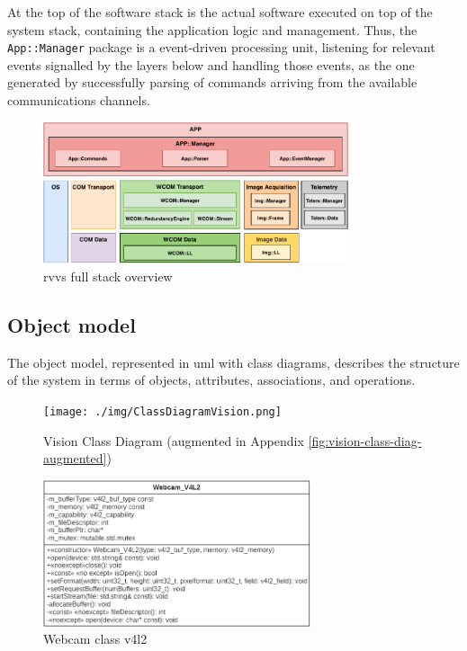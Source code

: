At the top of the software stack is the actual software executed on top of the
system stack, containing the application logic and management. Thus, the
\texttt{App::Manager} package is a event-driven processing unit, listening for
relevant events signalled by the layers below and handling those events, as the
one generated by successfully parsing of commands arriving from the available
communications channels. 
\begin{figure}[!hbt]
\centering
    \includegraphics[width=0.8\textwidth]{./img/rvvs-full-stack.pdf}
  \caption{\acrshort{rvvs} full stack overview}%
\label{fig:rvvs-full-stack}
\end{figure}
%
\subsection{Object model}%
\label{sec:object-model-rvvs}
The object model, represented in \gls{uml} with class diagrams, describes the
structure of the system in terms of objects, attributes, associations, and
operations.
%
\begin{figure}[!hbt]
\centering
    \texttt{[image: ./img/ClassDiagramVision.png]}
  \caption{Vision Class Diagram (augmented in Appendix \ref{fig:vision-class-diag-augmented})}%
\label{fig:vision-class-diag}
\end{figure}
%
%
\begin{figure}[!hbt]
\centering
    \includegraphics[width=0.7\textwidth]{./img/webcam_v4l2_class_diag.png}
  \caption{Webcam class v4l2}%
\label{fig:webcam-v4l2-class-diag}
\end{figure}
%

